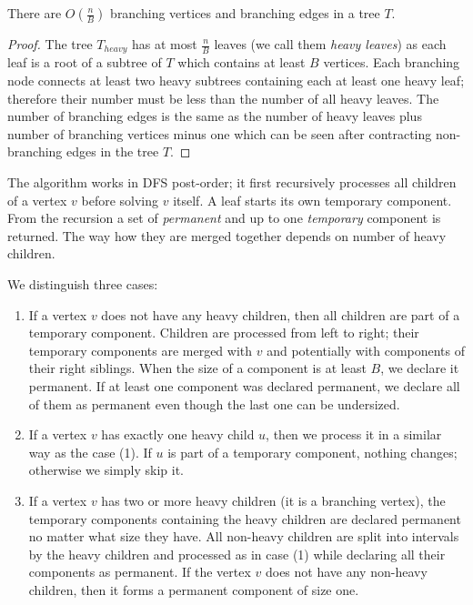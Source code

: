 \begin{lemma}
	There are $O\left(\frac{n}{B}\right)$ branching vertices and branching edges in a tree $T$.
\end{lemma}
\begin{proof}
	The tree $T_{heavy}$ has at most $\frac{n}{B}$ leaves (we call them \emph{heavy leaves}) as each leaf is a root of a subtree of $T$ which contains at least $B$ vertices.
	Each branching node connects at least two heavy subtrees containing each at least one heavy leaf; therefore their number must be less than the number of all heavy leaves.
	The number of branching edges is the same as the number of heavy leaves plus number of branching vertices minus one which can be seen after contracting non-branching edges in the tree $T$.
\end{proof}

The algorithm works in DFS post-order; it first recursively processes all children of a vertex $v$ before solving $v$ itself.
A leaf starts its own temporary component.
From the recursion a set of \emph{permanent} and up to one \emph{temporary} component is returned.
The way how they are merged together depends on number of heavy children.

We distinguish three cases:
\begin{enumerate}
	\item If a vertex $v$ does not have any heavy children, then all children are part of a temporary component.
	Children are processed from left to right; their temporary components are merged with $v$ and potentially with components of their right siblings.
	When the size of a component is at least $B$, we declare it permanent.
	If at least one component was declared permanent, we declare all of them as permanent even though the last one can be undersized.
	\item If a vertex $v$ has exactly one heavy child $u$, then we process it in a similar way as the case (1).
	If $u$ is part of a temporary component, nothing changes; otherwise we simply skip it.
	\item If a vertex $v$ has two or more heavy children (it is a branching vertex), the temporary components containing the heavy children are declared permanent no matter what size they have.
	All non-heavy children are split into intervals by the heavy children and processed as in case (1) while declaring all their components as permanent.
	If the vertex $v$ does not have any non-heavy children, then it forms a permanent component of size one.
\end{enumerate}

